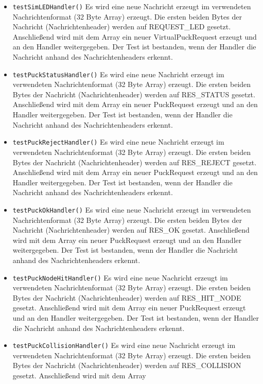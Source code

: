 \documentclass[10pt,a4paper]{article}
\begin{document}
\begin{itemize}
				\item \texttt{testSimLEDHandler()} Es wird eine neue Nachricht erzeugt im verwendeten Nachrichtenformat (32 Byte Array) erzeugt.
				Die ersten beiden Bytes der Nachricht (Nachrichtenheader) werden auf REQUEST\_LED gesetzt. Anschließend wird mit dem Array ein neuer
				VirtualPuckRequest erzeugt und an den Handler weitergegeben.
				Der Test ist bestanden, wenn der Handler die Nachricht anhand des Nachrichtenheaders erkennt.
				\item \texttt{testPuckStatusHandler()} Es wird eine neue Nachricht erzeugt im verwendeten Nachrichtenformat (32 Byte Array) erzeugt.
				Die ersten beiden Bytes der Nachricht (Nachrichtenheader) werden auf RES\_STATUS gesetzt. Anschließend wird mit dem Array ein
				neuer PuckRequest erzeugt und an den Handler weitergegeben.
				Der Test ist bestanden, wenn der Handler die Nachricht anhand des Nachrichtenheaders erkennt.
				\item \texttt{testPuckRejectHandler()} Es wird eine neue Nachricht erzeugt im verwendeten Nachrichtenformat (32 Byte Array) erzeugt.
				Die ersten beiden Bytes der Nachricht (Nachrichtenheader) werden auf RES\_REJECT gesetzt. Anschließend wird mit dem Array ein
				neuer PuckRequest erzeugt und an den Handler weitergegeben.
				Der Test ist bestanden, wenn der Handler die Nachricht anhand des Nachrichtenheaders erkennt.
				\item \texttt{testPuckOkHandler()} Es wird eine neue Nachricht erzeugt im verwendeten Nachrichtenformat (32 Byte Array) erzeugt.
				Die ersten beiden Bytes der Nachricht (Nachrichtenheader) werden auf RES\_OK gesetzt. Anschließend wird mit dem Array ein
				neuer PuckRequest erzeugt und an den Handler weitergegeben.
				Der Test ist bestanden, wenn der Handler die Nachricht anhand des Nachrichtenheaders erkennt.
				\item \texttt{testPuckNodeHitHandler()} Es wird eine neue Nachricht erzeugt im verwendeten Nachrichtenformat (32 Byte Array) erzeugt.
				Die ersten beiden Bytes der Nachricht (Nachrichtenheader) werden auf RES\_HIT\_NODE gesetzt. Anschließend wird mit dem Array ein
				neuer PuckRequest erzeugt und an den Handler weitergegeben.
				Der Test ist bestanden, wenn der Handler die Nachricht anhand des Nachrichtenheaders erkennt.
				\item \texttt{testPuckCollisionHandler()} Es wird eine neue Nachricht erzeugt im verwendeten Nachrichtenformat (32 Byte Array)
				erzeugt. Die ersten beiden Bytes der Nachricht (Nachrichtenheader) werden auf RES\_COLLISION gesetzt. Anschließend wird mit dem Array

\end{itemize}
\end{document}
